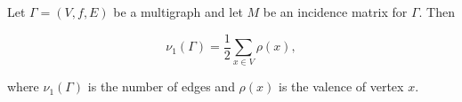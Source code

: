 Let $\Gamma = (V, f, E)$ be a multigraph and let $M$ be an incidence matrix for $\Gamma$. Then

$$\nu_1(\Gamma) = \frac{1}{2} \sum_{x \in V} \rho(x),$$

where $\nu_1(\Gamma)$ is the number of edges and $\rho(x)$ is the valence of vertex $x$.
